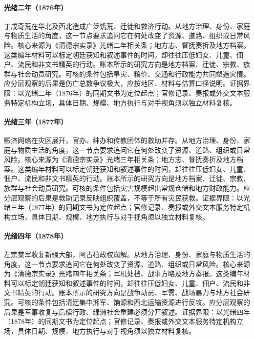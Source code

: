 \hypertarget{social:EQ-1876-NORTH-CHINA-FAMINE}{}\paragraph{光绪二年（1876年）}丁戊奇荒在华北及西北造成广泛饥荒、迁徙和救济行动。从地方治理、身份、家庭与物质生活的角度，这一节点要求追问它在何处改变了资源、道路、组织或日常风险。核心来源为《清德宗实录》光绪二年相关条；地方志、督抚奏折及地方档案。这类编年材料可以标定朝廷获知和叙述事件的时间，却往往压低妇女、儿童、佃户、流民和非文书精英的行动。账本所示的研究方向是地方档案、迁徙、宗教、族群与社会动员研究。可核的条件包括旱灾、粮价、交通和行政能力共同塑造灾情。应分层观察的后果是伤亡总数争议极大，应按地区、材料与估算口径说明。证据界限：以光绪二年（1876年）的同期文书为定位起点；官修记录、奏报或外交文本服务特定机构立场，具体日期、规模、地方执行与对手视角须以独立材料复核。
\hypertarget{social:EQ-1877-FAMINE-RELIEF-NETWORKS}{}\paragraph{光绪三年（1877年）}赈济网络在灾区展开，官办、绅办和传教团体的救助并存。从地方治理、身份、家庭与物质生活的角度，这一节点要求追问它在何处改变了资源、道路、组织或日常风险。核心来源为《清德宗实录》光绪三年相关条；地方志、督抚奏折及地方档案。这类编年材料可以标定朝廷获知和叙述事件的时间，却往往压低妇女、儿童、佃户、流民和非文书精英的行动。账本所示的研究方向是地方档案、迁徙、宗教、族群与社会动员研究。可核的条件包括灾害规模超出常规仓储和地方财政能力。应分层观察的后果是救助记录反映组织覆盖，不等于所有灾民获救。证据界限：以光绪三年（1877年）的同期文书为定位起点；官修记录、奏报或外交文本服务特定机构立场，具体日期、规模、地方执行与对手视角须以独立材料复核。
\hypertarget{social:EQ-1878-Zuo-ZONGTANG-XINJIANG}{}\paragraph{光绪四年（1878年）}左宗棠军收复新疆大部，阿古柏政权崩解。从地方治理、身份、家庭与物质生活的角度，这一节点要求追问它在何处改变了资源、道路、组织或日常风险。核心来源为《清德宗实录》光绪四年相关条；军机处档、战事方略及地方奏报。这类编年材料可以标定朝廷获知和叙述事件的时间，却往往压低妇女、儿童、佃户、流民和非文书精英的行动。账本所示的研究方向是战争动员、军需、战场暴力与地方社会研究。可核的条件包括清廷集中湘军、饷源和西北运输资源进行反攻。应分层观察的后果是军事收复与后续行政、绿洲社会重建必须分开叙述。证据界限：以光绪四年（1878年）的同期文书为定位起点；官修记录、奏报或外交文本服务特定机构立场，具体日期、规模、地方执行与对手视角须以独立材料复核。
